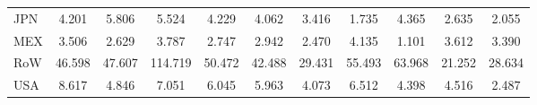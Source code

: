 \begin{table}[htbp]
\begin{tabular}{lcccccccccc}
  JPN & \textcolor[RGB]{128,82,128}{4.201} & \textcolor[RGB]{94,61,161}{5.806} & \textcolor[RGB]{99,64,156}{5.524} & \textcolor[RGB]{125,81,130}{4.229} & \textcolor[RGB]{135,87,120}{4.062} & \textcolor[RGB]{163,106,92}{3.416} & \textcolor[RGB]{237,153,18}{1.735} & \textcolor[RGB]{122,79,133}{4.365} & \textcolor[RGB]{189,122,66}{2.635} & \textcolor[RGB]{230,148,26}{2.055} \\ 
  MEX & \textcolor[RGB]{156,101,99}{3.506} & \textcolor[RGB]{191,124,64}{2.629} & \textcolor[RGB]{143,92,112}{3.787} & \textcolor[RGB]{184,119,71}{2.747} & \textcolor[RGB]{178,115,76}{2.942} & \textcolor[RGB]{204,132,51}{2.470} & \textcolor[RGB]{130,84,125}{4.135} & \textcolor[RGB]{250,162,5}{1.101} & \textcolor[RGB]{150,97,105}{3.612} & \textcolor[RGB]{166,107,89}{3.390} \\ 
  RoW & \textcolor[RGB]{15,10,240}{46.598} & \textcolor[RGB]{13,8,242}{47.607} & \textcolor[RGB]{3,2,252}{114.719} & \textcolor[RGB]{10,7,245}{50.472} & \textcolor[RGB]{18,12,237}{42.488} & \textcolor[RGB]{20,13,235}{29.431} & \textcolor[RGB]{8,5,247}{55.493} & \textcolor[RGB]{5,3,250}{63.968} & \textcolor[RGB]{31,20,224}{21.252} & \textcolor[RGB]{23,15,232}{28.634} \\ 
  USA & \textcolor[RGB]{59,38,196}{8.617} & \textcolor[RGB]{110,71,145}{4.846} & \textcolor[RGB]{74,48,181}{7.051} & \textcolor[RGB]{87,56,168}{6.045} & \textcolor[RGB]{89,58,166}{5.963} & \textcolor[RGB]{133,86,122}{4.073} & \textcolor[RGB]{79,51,176}{6.512} & \textcolor[RGB]{120,78,135}{4.398} & \textcolor[RGB]{117,76,138}{4.516} & \textcolor[RGB]{201,130,54}{2.487} \\ 
   \hline
\end{tabular}
\end{table}
